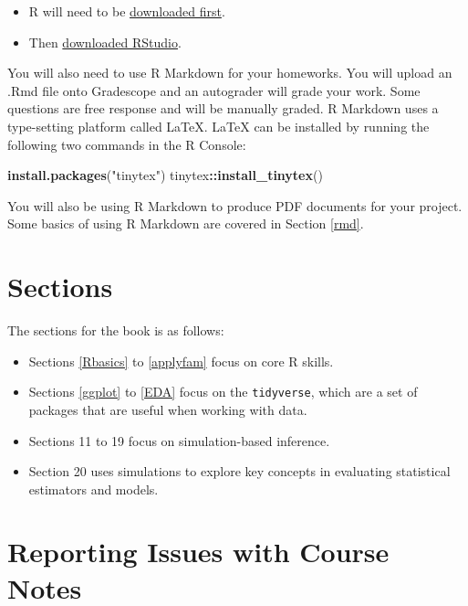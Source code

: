 \documentclass[
]{book}
\newenvironment{Shaded}{\begin{snugshade}}{\end{snugshade}}
\newcommand{\FunctionTok}[1]{\textcolor[rgb]{0.13,0.29,0.53}{\textbf{#1}}}
\newcommand{\NormalTok}[1]{#1}
\newcommand{\SpecialCharTok}[1]{\textcolor[rgb]{0.81,0.36,0.00}{\textbf{#1}}}
\newcommand{\StringTok}[1]{\textcolor[rgb]{0.31,0.60,0.02}{#1}}
\providecommand{\tightlist}{%
  \setlength{\itemsep}{0pt}\setlength{\parskip}{0pt}}
\theoremstyle{definition}
\theoremstyle{definition}
\theoremstyle{definition}
\theoremstyle{definition}
\theoremstyle{remark}
\begin{document}
\begin{itemize}
\tightlist
\item
  R will need to be \href{https://www.r-project.org/}{downloaded first}.
\item
  Then \href{https://docs.posit.co/ide/user/\#rstudio-ide-oss-downloads}{downloaded RStudio}.
\end{itemize}

You will also need to use R Markdown for your homeworks. You will upload an .Rmd file onto Gradescope and an autograder will grade your work. Some questions are free response and will be manually graded. R Markdown uses a type-setting platform called LaTeX. LaTeX can be installed by running the following two commands in the R Console:

\begin{Shaded}
\begin{Highlighting}[]
\FunctionTok{install.packages}\NormalTok{(}\StringTok{"tinytex"}\NormalTok{)}
\NormalTok{tinytex}\SpecialCharTok{::}\FunctionTok{install\_tinytex}\NormalTok{()}
\end{Highlighting}
\end{Shaded}

You will also be using R Markdown to produce PDF documents for your project. Some basics of using R Markdown are covered in Section \ref{rmd}.

\hypertarget{sections}{%
\section*{Sections}\label{sections}}

The sections for the book is as follows:

\begin{itemize}
\tightlist
\item
  Sections \ref{Rbasics} to \ref{applyfam} focus on core R skills.
\item
  Sections \ref{ggplot} to \ref{EDA} focus on the \texttt{tidyverse}, which are a set of packages that are useful when working with data.
\item
  Sections 11 to 19 focus on simulation-based inference.
\item
  Section 20 uses simulations to explore key concepts in evaluating statistical estimators and models.
\end{itemize}

\hypertarget{reporting-issues-with-course-notes}{%
\section*{Reporting Issues with Course Notes}\label{reporting-issues-with-course-notes}}
\end{document}
